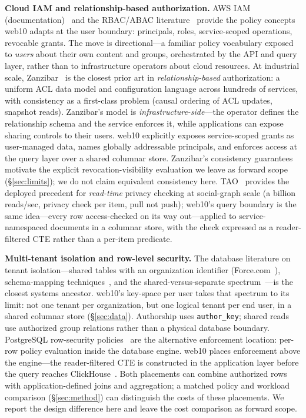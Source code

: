 \documentclass[sigconf, nonacm]{acmart}
\begin{document}
\textbf{Cloud IAM and relationship-based authorization.}
AWS IAM (documentation)~\cite{awsiam} and the RBAC/ABAC
literature~\cite{ferraiolo1992, sandhu1996, abac2014} provide the policy
concepts web10 adapts at the user boundary: principals, roles,
service-scoped operations, revocable grants. The move is directional---a
familiar policy vocabulary exposed to \emph{users} about their own content
and groups, orchestrated by the API and query layer, rather than to
infrastructure operators about cloud resources. At industrial scale,
Zanzibar~\cite{zanzibar2019} is the closest prior art in
\emph{relationship-based} authorization: a uniform ACL data model and
configuration language across hundreds of services, with consistency as a
first-class problem (causal ordering of ACL updates, snapshot reads).
Zanzibar's model is \emph{infrastructure-side}---the operator defines the
relationship schema and the service enforces it, while applications can
expose sharing controls to their users. web10 explicitly exposes
service-scoped grants as user-managed data, names globally addressable
principals, and enforces access at the query layer over a shared columnar
store. Zanzibar's consistency guarantees motivate the explicit
revocation-visibility evaluation we leave as forward scope
(\S\ref{sec:limits}); we do not claim equivalent consistency here.
TAO~\cite{tao2013} provides the deployed precedent for \emph{read-time}
privacy checking at social-graph scale (a billion reads/sec, privacy check
per item, pull not push); web10's query boundary is the same idea---every
row access-checked on its way out---applied to service-namespaced documents
in a columnar store, with the check expressed as a reader-filtered CTE
rather than a per-item predicate.

\textbf{Multi-tenant isolation and row-level security.}
The database literature on tenant isolation---shared tables with an
organization identifier (Force.com~\cite{force2009}), schema-mapping
techniques~\cite{aulbach2008}, and the shared-versus-separate
spectrum~\cite{jacobs2007}---is the closest systems ancestor. web10's
key-space per user takes that spectrum to its limit: not one tenant per
organization, but one logical tenant per end user, in a shared columnar
store (\S\ref{sec:data}). Authorship uses \texttt{author\_key}; shared reads
use authorized group relations rather than a physical database boundary.
PostgreSQL row-security policies~\cite{postgres-rls} are the alternative
enforcement location: per-row policy evaluation inside the database engine.
web10 places enforcement above the engine---the reader-filtered CTE is
constructed in the application layer before the query reaches
ClickHouse~\cite{clickhouse2024}. Both placements can combine authorized
rows with application-defined joins and aggregation; a matched policy and
workload comparison (\S\ref{sec:method}) can distinguish the costs of these
placements. We report the design difference here and leave the cost
comparison as forward scope.
\end{document}

